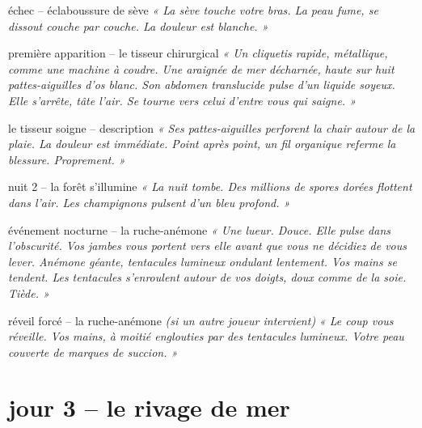 \documentclass[10pt, a4paper]{article}
\begin{document}
\begin{momentbox}{échec -- éclaboussure de sève}
\textit{« La sève touche votre bras. La peau fume, se dissout couche par couche. La douleur est blanche. »}
\end{momentbox}

\begin{creaturebox}{première apparition -- le tisseur chirurgical}
\textit{« Un cliquetis rapide, métallique, comme une machine à coudre. Une araignée de mer décharnée, haute sur huit pattes-aiguilles d'os blanc. Son abdomen translucide pulse d'un liquide soyeux. Elle s'arrête, tâte l'air. Se tourne vers celui d'entre vous qui saigne. »}
\end{creaturebox}

\begin{momentbox}{le tisseur soigne -- description}
\textit{« Ses pattes-aiguilles perforent la chair autour de la plaie. La douleur est immédiate. Point après point, un fil organique referme la blessure. Proprement. »}
\end{momentbox}

\begin{transitionbox}{nuit 2 -- la forêt s'illumine}
\textit{« La nuit tombe. Des millions de spores dorées flottent dans l'air. Les champignons pulsent d'un bleu profond. »}
\end{transitionbox}

\begin{momentbox}{événement nocturne -- la ruche-anémone}
\textit{« Une lueur. Douce. Elle pulse dans l'obscurité. Vos jambes vous portent vers elle avant que vous ne décidiez de vous lever. Anémone géante, tentacules lumineux ondulant lentement. Vos mains se tendent. Les tentacules s'enroulent autour de vos doigts, doux comme de la soie. Tiède. »}
\end{momentbox}

\begin{momentbox}{réveil forcé -- la ruche-anémone}
\textit{(si un autre joueur intervient)}
\textit{« Le coup vous réveille. Vos mains, à moitié englouties par des tentacules lumineux. Votre peau couverte de marques de succion. »}
\end{momentbox}

\section*{jour 3 -- le rivage de mer}
\end{document}
